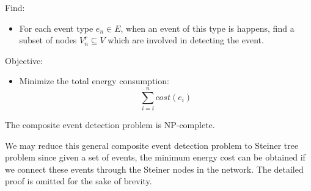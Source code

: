 Find:
\begin{itemize}
	\item For each event type \(e_n\in E\), when an event of this type is happens, find a subset of nodes \(V_n^r\subseteq V\) which are involved in detecting the event.
\end{itemize}

Objective:
\begin{itemize}
	\item Minimize the total energy consumption:
	\begin{displaymath}
	\sum_{i=i}^{n}cost(e_i)
	\end{displaymath}
\end{itemize}

\begin{theorem}
\label{thm:tableConstruction}
The composite event detection problem is NP-complete.
\end{theorem}
We may reduce this general composite event detection problem to Steiner tree problem since given a set of events, the minimum energy cost can be obtained if we connect these events through the Steiner nodes in the network. The detailed proof is omitted for the sake of brevity.
